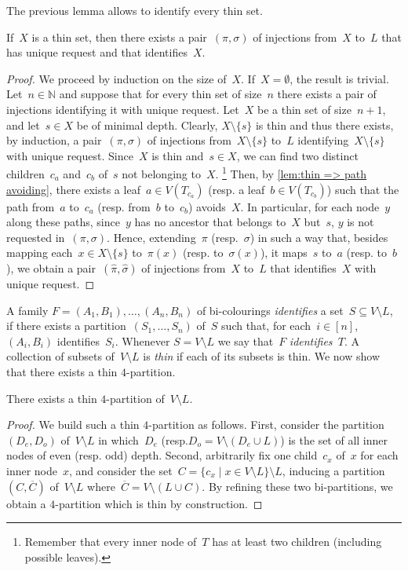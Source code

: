 \documentclass{lmcs} %
\newcommand{\resp}{resp.\xspace}
\begin{document}
The previous lemma allows to identify every thin set.
\begin{lem}
    \label{lem:thin => identifiable}
    If~$X$ is a thin set,
    then there exists a pair~$(\pi,\sigma)$
    of injections from~$X$ to~$L$
    that has unique request and that identifies~$X$.
\end{lem}
\begin{proof}
    We proceed by induction on the size of~$X$.
    If~$X=\emptyset$, the result is trivial.
    Let~$n\in\mathbb{N}$ and suppose that for every thin set of size~$n$
    there exists a pair of injections identifying it with unique request.
    Let~$X$ be a thin set of size~$n+1$,
    and let~$s\in X$ be of minimal depth.
    Clearly, $X\setminus\{s\}$ is thin
    and thus there exists, by induction, a pair~$(\pi,\sigma)$
    of injections from~$X\setminus\{s\}$ to~$L$ identifying~$X\setminus\{s\}$ with unique request.
    Since~$X$ is thin and~$s\in X$,
    we can find two distinct children~$c_a$ and~$c_b$ of~$s$
    not belonging to~$X$.%
    \footnote{\label{fn:out-degree at least 2}Remember that every inner node of~$T$ has at least two children (including possible leaves).}
    Then, by \autoref{lem:thin => path avoiding},
    there exists a leaf~$a\in V(T_{c_a})$ (\resp a leaf~$b\in V(T_{c_b})$)
    such that the path from~$a$ to~$c_a$ (\resp from~$b$ to~$c_b$)
    avoids~$X$.
    In particular, for each node~$y$ along these paths,
    since~$y$ has no ancestor that belongs to~$X$ but~$s$,
    $y$ is not requested in~$(\pi,\sigma)$.
    Hence,
    extending~$\pi$ (\resp~$\sigma$) in such a way that,
    besides mapping each~$x\in X\setminus\{s\}$ to~$\pi(x)$ (\resp to~$\sigma(x)$),
    it maps~$s$ to~$a$ (\resp to~$b$),
    we obtain a pair~$(\hat{\pi},\hat{\sigma})$
    of injections from~$X$ to~$L$
    that identifies~$X$ with unique request.
\end{proof}

A family $F=(A_1,B_1),\ldots,(A_n,B_n)$ of bi-colourings
\emph{identifies} a set~$S\subseteq V\setminus L$,
if there exists a partition~$(S_1,\ldots,S_n)$ of~$S$
such that, for each~$i\in[n]$, $(A_i,B_i)$ identifies~$S_i$.
Whenever $S=V\setminus L$ we say that~$F$ \emph{identifies~$T$}.
%
A collection of subsets of~$V\setminus L$ is \emph{thin}
if each of its subsets is thin.
We now show that there exists a thin $4$-partition.
\begin{lem}
    \label{lem:thin 4-partition}
    There exists a thin $4$-partition of~$V\setminus L$.
\end{lem}
\begin{proof}
    We build such a thin $4$-partition as follows.
    First, consider the partition~$(D_e,D_o)$ of~$V\setminus L$
    in which~$D_e$ (\resp $D_o=V\setminus(D_e\cup L)$) is the set of all inner nodes of even (\resp odd) depth.
    Second, arbitrarily fix one child~$c_x$ of~$x$ for each inner node~$x$,
    and consider the set~$C=\{ c_x \mid x\in V\setminus L \}\setminus L$,
    inducing a partition~$(C,\overline{C})$ of~$V\setminus L$ where~$\overline{C}=V\setminus(L\cup C)$.
    By refining these two bi-partitions, we obtain a $4$-partition which is thin by construction.%
\end{proof}
\end{document}
